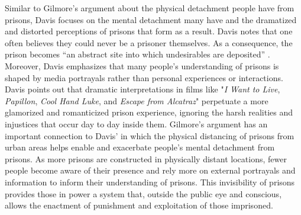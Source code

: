 Similar to Gilmore's argument about the physical detachment people have from prisons, Davis focuses on the mental detachment many have and the dramatized and distorted perceptions of prisons that form as a result. Davis notes that one often believes they could never be a prisoner themselves. As a consequence, the prison becomes “an abstract site into which undesirables are deposited” \cite*[16]{davisArePrisonsObsolete2003}. Moreover, Davis emphasizes that many people's understanding of prisons is shaped by media portrayals rather than personal experiences or interactions. Davis points out that dramatic interpretations in films like "\textit{I Want to Live}, \textit{Papillon}, \textit{Cool Hand Luke}, and \textit{Escape from Alcatraz}" \cite*[18]{davisArePrisonsObsolete2003} perpetuate a more glamorized and romanticized prison experience, ignoring the harsh realities and injustices that occur day to day inside them. Gilmore's argument has an important connection to Davis' in which the physical distancing of prisons from urban areas helps enable and exacerbate people's mental detachment from prisons. As more prisons are constructed in physically distant locations, fewer people become aware of their presence and rely more on external portrayals and information to inform their understanding of prisons. This invisibility of prisons provides those in power a system that, outside the public eye and conscious, allows the enactment of punishment and exploitation of those imprisoned.

